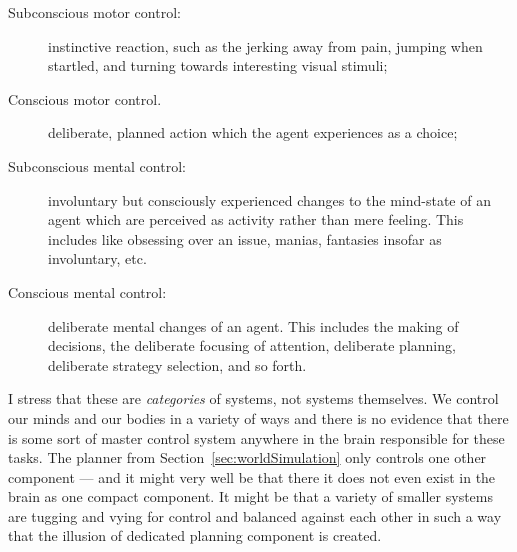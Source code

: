\begin{description}
	\item[Subconscious motor control:] instinctive reaction, such as the jerking away from pain, jumping when startled, and turning towards interesting visual stimuli;
	\item[Conscious motor control.] deliberate, planned action which the agent experiences as a choice;
	\item[Subconscious mental control:] involuntary but consciously experienced changes to the mind-state of an agent which are perceived as activity rather than mere feeling. This includes like obsessing over an issue, manias, fantasies insofar as involuntary, etc.
	\item[Conscious mental control:] deliberate mental changes of an agent. This includes the making of decisions, the deliberate focusing of attention, deliberate planning, deliberate strategy selection, and so forth.
\end{description}

I stress that these are {\em categories} of systems, not systems themselves. We control our minds and our bodies in a variety of ways and there is no evidence that there is some sort of master control system anywhere in the brain responsible for these tasks. The planner from Section~\ref{sec:worldSimulation} only controls one other component --- and it might very well be that there it does not even exist in the brain as one compact component. It might be that a variety of smaller systems are tugging and vying for control and balanced against each other in such a way that the illusion of dedicated planning component is created.
